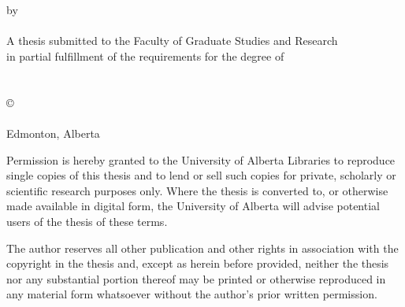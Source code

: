 
  \begin{center}
    \Large{\textbf{\school}}  \\ [.6in]
    \Large{\textbf{\thesistitle}} \\ [.1in]
    \normalsize{by} \\ [.1in]
    \Large{\textbf{\name}}  \\ [.6in]
    \normalsize{A thesis submitted to the Faculty of Graduate Studies and Research \\
    in partial fulfillment of the requirements for the degree of} \\ [0.1in]
    \Large{\textbf{\program}} \\ [.1in]
    \normalsize{\dept} \\ [0.6in]
    \scriptsize{\copyright\:\name} \\
    \scriptsize{\semester} \\
    \scriptsize{Edmonton, Alberta} \\ [0.6in]
    \scriptsize{Permission is hereby granted to the University of Alberta Libraries to reproduce single copies of this thesis and to lend or sell such copies for private, scholarly or scientific research purposes only. Where the thesis is converted to, or otherwise made available in digital form, the University of Alberta will advise potential users of the thesis of these terms.

The author reserves all other publication and other rights in association with the copyright in the thesis and, except as herein before provided, neither the thesis nor any substantial portion thereof may be printed or otherwise reproduced in any material form whatsoever without the author's prior written permission.}
  \end{center}



